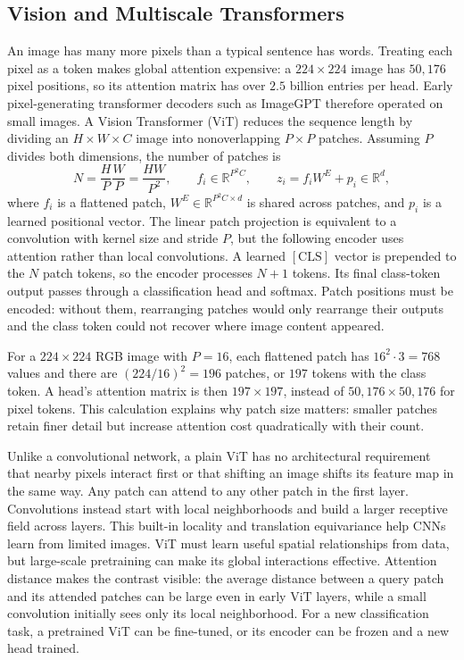 \subsection{Vision and Multiscale Transformers}

An image has many more pixels than a typical sentence has words. Treating each
pixel as a token makes global attention expensive: a $224\times224$ image has
$50{,}176$ pixel positions, so its attention matrix has over $2.5$ billion
entries per head. Early pixel-generating transformer decoders such as ImageGPT
therefore operated on small images. A Vision Transformer (ViT) reduces the
sequence length by dividing an $H\times W\times C$ image into nonoverlapping
$P\times P$ patches. Assuming $P$ divides both dimensions, the number of
patches is
\begin{equation}
  N=\frac{H}{P}\frac{W}{P}=\frac{HW}{P^2},\qquad
  f_i\in\mathbb R^{P^2C},\qquad
  z_i=f_iW^E+p_i\in\mathbb R^d,
  \label{eq:vit-patches}
\end{equation}
\noindent
where $f_i$ is a flattened patch, $W^E\in\mathbb R^{P^2C\times d}$ is shared
across patches, and $p_i$ is a learned positional vector. The linear patch
projection is equivalent to a convolution with kernel size and stride $P$,
but the following encoder uses attention rather than local convolutions.
A learned $[\mathrm{CLS}]$ vector is prepended to the $N$ patch tokens, so
the encoder processes $N+1$ tokens. Its final class-token output passes
through a classification head and softmax. Patch positions must be encoded:
without them, rearranging patches would only rearrange their outputs and the
class token could not recover where image content appeared.

For a $224\times224$ RGB image with $P=16$, each flattened patch has
$16^2\cdot3=768$ values and there are $(224/16)^2=196$ patches, or $197$
tokens with the class token. A head's attention matrix is then
$197\times197$, instead of $50{,}176\times50{,}176$ for pixel tokens. This
calculation explains why patch size matters: smaller patches retain finer
detail but increase attention cost quadratically with their count.

Unlike a convolutional network, a plain ViT has no architectural requirement
that nearby pixels interact first or that shifting an image shifts its feature
map in the same way. Any patch can attend to any other patch in the first
layer. Convolutions instead start with local neighborhoods and build a larger
receptive field across layers. This built-in locality and translation
equivariance help CNNs learn from limited images. ViT must learn useful
spatial relationships from data, but large-scale pretraining can make its
global interactions effective. Attention distance makes the contrast visible:
the average distance between a query patch and its attended patches can be
large even in early ViT layers, while a small convolution initially sees only
its local neighborhood. For a new classification task, a pretrained ViT can
be fine-tuned, or its encoder can be frozen and a new head trained.

